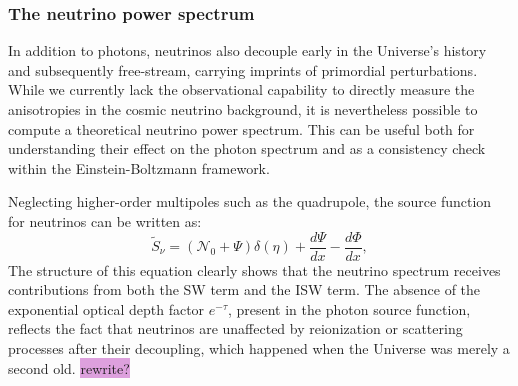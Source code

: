 \documentclass{aa}
\numberwithin{equation}{section}
\numberwithin{table}{section}
\numberwithin{figure}{section}
\begin{document}
\subsubsection{The neutrino power spectrum}
In addition to photons, neutrinos also decouple early in the Universe's history and subsequently free-stream, carrying imprints of primordial perturbations. While we currently lack the observational capability to directly measure the anisotropies in the cosmic neutrino background, it is nevertheless possible to compute a theoretical neutrino power spectrum. This can be useful both for understanding their effect on the photon spectrum and as a consistency check within the Einstein-Boltzmann framework.


Neglecting higher-order multipoles such as the quadrupole, the source function for neutrinos can be written as:
\begin{equation}
\tilde{S}_\nu = (\mathcal{N}_0 + \Psi)\delta(\eta) + \frac{d\Psi}{dx} - \frac{d\Phi}{dx},
\end{equation}
The structure of this equation clearly shows that the neutrino spectrum receives contributions from both the SW term and the ISW term. The absence of the exponential optical depth factor $e^{-\tau}$, present in the photon source function, reflects the fact that neutrinos are unaffected by reionization or scattering processes after their decoupling, which happened when the Universe was merely a second old. \colorbox{Plum}{rewrite?}

\end{document}
